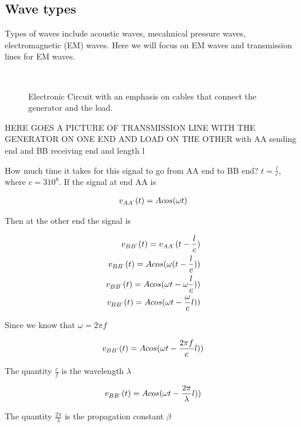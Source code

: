 \subsection{Wave types}
 Types of waves include acoustic waves,
mecahnical pressure waves, electromagnetic (EM) waves. Here we will focus
on EM waves and transmission lines for EM waves. 


\begin{figure}[htbp]
\begin{center}
\strut{} \\
\end{center}
\caption{Electronic Circuit with an emphasis on cables that connect the generator and the load.}
\label{wind}
\end{figure}


HERE GOES A PICTURE OF TRANSMISSION LINE WITH THE GENERATOR ON ONE END
AND LOAD ON THE OTHER with AA sending end and BB receiving end and
length l

How much time it takes for this signal to go from AA end to BB end? 
$t=\frac{l}{c}$, where $c=3 10^8$. If the signal at end AA is

\begin{eqnarray}
v_{AA^`}(t)=A cos(\omega t)
\end{eqnarray}

Then at the other end the signal is


\begin{eqnarray}
v_{BB^`}(t)=v_{AA^`}(t-\frac{l}{c}) \\
v_{BB^`}(t)=A cos(\omega (t - \frac{l}{c}))  \\
v_{BB^`}(t)=A cos(\omega t - \omega \frac{l}{c})) \\
v_{BB^`}(t)=A cos(\omega t -  \frac{\omega }{c} l)) 
\end{eqnarray}

Since we know that $\omega = 2 \pi f$


\begin{eqnarray}
v_{BB^`}(t)=A cos(\omega t -  \frac{ 2 \pi f }{c} l)) 
\end{eqnarray}

The quantity $\frac{c}{f}$ is the wavelength $\lambda$


\begin{eqnarray}
v_{BB^`}(t)=A cos(\omega t -  \frac{ 2 \pi }{\lambda} l)) \label{tllength}
\end{eqnarray}

The quantity $ \frac{ 2 \pi }{\lambda} $ is the propagation constant $\beta$


